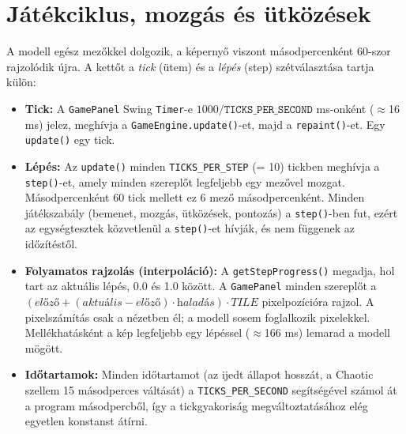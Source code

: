 \documentclass[11pt, a4paper]{article}
\begin{document}
\section{Játékciklus, mozgás és ütközések}
\label{sec:game_loop}
A modell egész mezőkkel dolgozik, a képernyő viszont másodpercenként 60-szor rajzolódik újra. A kettőt a \textit{tick} (ütem) és a \textit{lépés} (step) szétválasztása tartja külön:
\begin{itemize}
    \item \textbf{Tick:} A \texttt{GamePanel} Swing \texttt{Timer}-e $1000 / \texttt{TICKS\_PER\_SECOND}$ ms-onként ($\approx$16 ms) jelez, meghívja a \texttt{GameEngine.update()}-et, majd a \texttt{repaint()}-et. Egy \texttt{update()} egy tick.
    \item \textbf{Lépés:} Az \texttt{update()} minden \texttt{TICKS\_PER\_STEP} (= 10) tickben meghívja a \texttt{step()}-et, amely minden szereplőt legfeljebb egy mezővel mozgat. Másodpercenként 60 tick mellett ez 6 mező másodpercenként. Minden játékszabály (bemenet, mozgás, ütközések, pontozás) a \texttt{step()}-ben fut, ezért az egységtesztek közvetlenül a \texttt{step()}-et hívják, és nem függenek az időzítéstől.
    \item \textbf{Folyamatos rajzolás (interpoláció):} A \texttt{getStepProgress()} megadja, hol tart az aktuális lépés, 0.0 és 1.0 között. A \texttt{GamePanel} minden szereplőt a $(\textit{előző} + (\textit{aktuális} - \textit{előző}) \cdot \textit{haladás}) \cdot \textit{TILE}$ pixelpozícióra rajzol. A pixelszámítás csak a nézetben él; a modell sosem foglalkozik pixelekkel. Mellékhatásként a kép legfeljebb egy lépéssel ($\approx$166 ms) lemarad a modell mögött.
    \item \textbf{Időtartamok:} Minden időtartamot (az ijedt állapot hosszát, a Chaotic szellem 15 másodperces váltását) a \texttt{TICKS\_PER\_SECOND} segítségével számol át a program másodpercből, így a tickgyakoriság megváltoztatásához elég egyetlen konstanst átírni.
\end{itemize}
\end{document}
